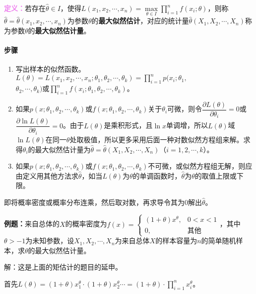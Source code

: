 \textcolor{violet}{\textbf{定义：}}若存在$\hat{\theta}\in I$，使得$L(x_1,x_2,\cdots,x_n)=\max\limits_{\theta\in I}\prod\limits_{i=1}^nf(x_i;\theta)$，则称$\hat{\theta}=\hat{\theta}(x_1,x_2,\cdots,x_n)$为参数$\theta$的\textbf{最大似然估计}，对应的统计量$\hat{\theta}(X_1,X_2,\cdots,X_n)$称为参数$\theta$的\textbf{最大似然估计量}。

\paragraph{步骤} \leavevmode \medskip

\begin{enumerate}
    \item 写出样本的似然函数。$L(\theta)=L(x_1,x_2,\cdots,x_n;\theta_1,\theta_2,\cdots,\theta_k)=\prod\limits_{i=1}^np(x_i;\theta_1,$\\$\theta_2,\cdots,\theta_k)$或$\prod\limits_{i=1}^nf(x_i;\theta_1,\theta_2,\cdots,\theta_k)$。
    \item 如果$p(x;\theta_1,\theta_2,\cdots,\theta_k)$或$f(x;\theta_1,\theta_2,\cdots,\theta_k)$关于$\theta_i$可微，则令$\dfrac{\partial L(\theta)}{\partial\theta_i}=0$或$\dfrac{\partial\ln L(\theta)}{\partial\theta_i}=0$。由于$L(\theta)$是乘积形式，且$\ln x$单调增，所以$L(\theta)$域$\ln L(\theta)$在同一$\theta$处取极值，所以更多采用后面一种对数似然方程组来解。求得$\theta_i$的最大似然估计量为$\hat{\theta}=\hat{\theta}(X_1,X_2,\cdots,X_n)$（$i=1,2,\cdots,k$）。
    \item 如果$p(x;\theta_1,\theta_2,\cdots,\theta_k)$或$f(x;\theta_1,\theta_2,\cdots,\theta_k)$不可微，或似然方程组无解，则应由定义用其他方法求$\hat{\theta}$，如当$L(\theta)$为$\theta$的单调函数时，$\hat{\theta}$为$\theta$的取值上限或下限。
\end{enumerate}

即将概率密度或概率分布连乘，然后取对数，再求导令其为0解出$\hat{\theta}$。

\textbf{例题：}来自总体的$X$的概率密度为$f(x)=\left\{\begin{array}{ll}
    (1+\theta)x^\theta, & 0<x<1 \\
    0, & \text{其他}
\end{array}\right.$，其中$\theta>-1$为未知参数，设$X_1,X_2,\cdots,X_n$为来自总体$X$的样本容量为$n$的简单随机样本，求$\theta$的最大似然估计量。

解：这是上面的矩估计的题目的延申。

首先$L(\theta)=(1+\theta)x_1^\theta\cdot(1+\theta)x_2^\theta\cdots=(1+\theta)\cdot\prod\limits_{i=1}^nx_i^\theta$。

